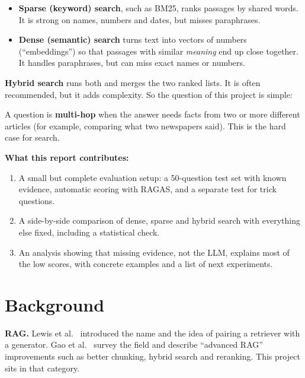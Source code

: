 \documentclass[10pt,twocolumn]{article}
\newcommand{\term}[1]{\textbf{#1}}
\begin{document}
\begin{itemize}
\item \term{Sparse (keyword) search}, such as BM25, ranks passages by shared words. It is strong on names, numbers and dates, but misses paraphrases.
\item \term{Dense (semantic) search} turns text into vectors of numbers (``embeddings'') so that passages with similar \emph{meaning} end up close together. It handles paraphrases, but can miss exact names or numbers.
\end{itemize}

\term{Hybrid search} runs both and merges the two ranked lists. It is often recommended, but it adds complexity. So the question of this project is simple:

\begin{center}
\end{center}

A question is \term{multi-hop} when the answer needs facts from two or more different articles (for example, comparing what two newspapers said). This is the hard case for search.

\textbf{What this report contributes:}
\begin{enumerate}
\item A small but complete evaluation setup: a 50-question test set with known evidence, automatic scoring with RAGAS, and a separate test for trick questions.
\item A side-by-side comparison of dense, sparse and hybrid search with everything else fixed, including a statistical check.
\item An analysis showing that missing evidence, not the LLM, explains most of the low scores, with concrete examples and a list of next experiments.
\end{enumerate}

\section{Background}

\textbf{RAG.} Lewis et al.\ \cite{lewis} introduced the name and the idea of pairing a retriever with a generator. Gao et al.\ \cite{gao} survey the field and describe ``advanced RAG'' improvements such as better chunking, hybrid search and reranking. This project sits in that category.
\end{document}
